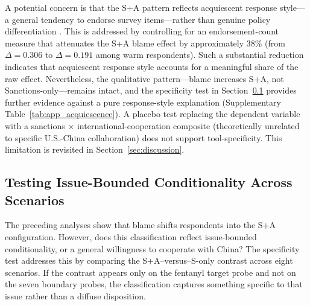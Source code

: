 \documentclass[12pt,letterpaper]{article}
\begin{document}
A potential concern is that the S+A pattern reflects acquiescent response style---a general tendency to endorse survey items---rather than genuine policy differentiation \citep{krosnick_response_1991}. This is addressed by controlling for an endorsement-count measure that attenuates the S+A blame effect by approximately 38\% (from $\Delta = 0.306$ to $\Delta = 0.191$ among warm respondents). Such a substantial reduction indicates that acquiescent response style accounts for a meaningful share of the raw effect. Nevertheless, the qualitative pattern---blame increases S+A, not Sanctions-only---remains intact, and the specificity test in Section~\ref{sec:results_specificity} provides further evidence against a pure response-style explanation (Supplementary Table~\ref{tab:app_acquiescence}). A placebo test replacing the dependent variable with a sanctions $\times$ international-cooperation composite (theoretically unrelated to specific U.S.-China collaboration) does not support tool-specificity. This limitation is revisited in Section~\ref{sec:discussion}.

\subsection{Testing Issue-Bounded Conditionality Across Scenarios}
\label{sec:results_specificity}

The preceding analyses show that blame shifts respondents into the S+A configuration. However, does this classification reflect issue-bounded conditionality, or a general willingness to cooperate with China? The specificity test addresses this by comparing the S+A--versus--S-only contrast across eight scenarios. If the contrast appears only on the fentanyl target probe and not on the seven boundary probes, the classification captures something specific to that issue rather than a diffuse disposition.
\end{document}
